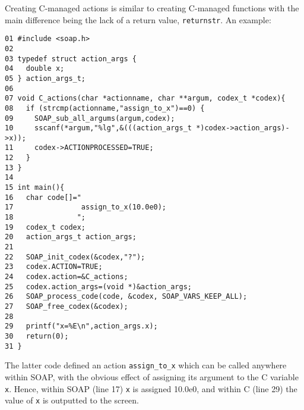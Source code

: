 \documentclass{warpdoc}
\begin{document}
Creating C-managed actions is similar to creating C-managed functions
with the main difference being the lack of a return value, \verb|returnstr|.
An example:
%
\begin{verbatim}
01 #include <soap.h>
02
03 typedef struct action_args {
04   double x;
05 } action_args_t;
06
07 void C_actions(char *actionname, char **argum, codex_t *codex){
08   if (strcmp(actionname,"assign_to_x")==0) {
09     SOAP_sub_all_argums(argum,codex);
10     sscanf(*argum,"%lg",&(((action_args_t *)codex->action_args)->x));
11     codex->ACTIONPROCESSED=TRUE;
12   }
13 }
14
15 int main(){
16   char code[]="
17                assign_to_x(10.0e0);
18               ";
19   codex_t codex;
20   action_args_t action_args;
21
22   SOAP_init_codex(&codex,"?");
23   codex.ACTION=TRUE;
24   codex.action=&C_actions;
25   codex.action_args=(void *)&action_args;
26   SOAP_process_code(code, &codex, SOAP_VARS_KEEP_ALL);
27   SOAP_free_codex(&codex);
28
29   printf("x=%E\n",action_args.x);
30   return(0);
31 }
\end{verbatim}
%
The latter code defined an action \verb|assign_to_x| which can be
called anywhere within SOAP, with the obvious effect of assigning its argument
to the C variable \verb|x|. Hence, within SOAP (line 17) \verb|x| is assigned 10.0e0,
and within C (line 29) the value of \verb|x| is outputted to the screen.




  
  
\end{document}
